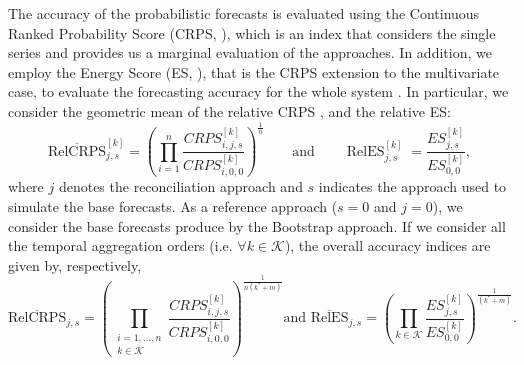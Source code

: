 \documentclass[a4paper,11pt]{article}
\newcommand{\xvet}{\bm{x}}
\newcommand{\zvet}{\bm{z}}
\theoremstyle{definition}
\begin{document}
The accuracy of the probabilistic forecasts is evaluated using the Continuous Ranked Probability Score (CRPS, \citealp{gneiting2014}), %
which is an index that considers the single series and provides us a marginal evaluation of the approaches. In addition, we employ the Energy Score (ES, \citealp{gneiting2014}), that is the CRPS extension to the multivariate case, to evaluate the forecasting accuracy for the whole system \citep{panagiotelis2023, wickramasuriya2021b}.
In particular, we consider the geometric mean of the relative CRPS \citep{fleming1986}, and the relative ES:
\begin{equation}\label{eq:skill}
	\operatorname{\overline{RelCRPS}}_{j,s}^{[k]} = \left(\prod_{i = 1}^n \frac{CRPS^{[k]}_{i, j, s}}{CRPS^{[k]}_{i, 0, 0}}\right)^{\frac{1}{n}} \qquad \mathrm{and} \qquad \operatorname{RelES}_{j,s}^{[k]} = \frac{ES^{[k]}_{j, s}}{ES^{[k]}_{0, 0}},
\end{equation}
where $j$ denotes the reconciliation approach and $s$ indicates the approach used to simulate the base forecasts. As a reference approach ($s=0$ and $j=0$), we consider the base forecasts produce by the Bootstrap approach. If we consider all the temporal aggregation orders (i.e. $\forall k \in \mathcal{K}$), the overall accuracy indices are given by, respectively, 
\begin{equation}\label{eq:skill_all}
	\operatorname{\overline{RelCRPS}}_{j,s} = \left(\prod_{\substack{i = 1, \dots, n \\ k \in \mathcal{K}}}\frac{CRPS^{[k]}_{i, j, s}}{CRPS^{[k]}_{i, 0, 0}}\right)^{\frac{1}{n(k^\ast+m)}}\mbox{and } \operatorname{\overline{RelES}}_{j,s}= \left(\prod_{k \in \mathcal{K}}\frac{ES^{[k]}_{j, s}}{ES^{[k]}_{0, 0}}\right)^{\frac{1}{(k^\ast+m)}}.
\end{equation}
\end{document}
